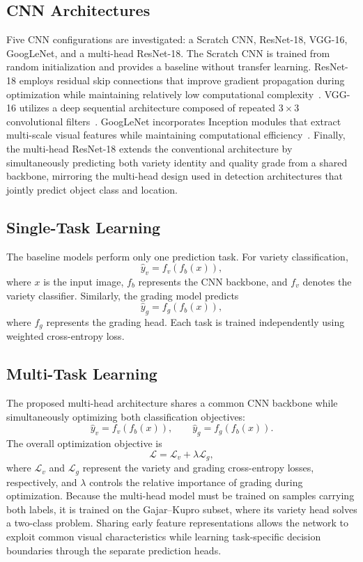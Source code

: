 \documentclass[conference]{IEEEtran}
\begin{document}
\subsection{CNN Architectures}
Five CNN configurations are investigated: a Scratch CNN, ResNet-18, VGG-16, GoogLeNet, and a multi-head ResNet-18. The Scratch CNN is trained from random initialization and provides a baseline without transfer learning. ResNet-18 employs residual skip connections that improve gradient propagation during optimization while maintaining relatively low computational complexity~\cite{he2016resnet}. VGG-16 utilizes a deep sequential architecture composed of repeated $3\times3$ convolutional filters~\cite{simonyan2015vgg}. GoogLeNet incorporates Inception modules that extract multi-scale visual features while maintaining computational efficiency~\cite{szegedy2015googlenet}. Finally, the multi-head ResNet-18 extends the conventional architecture by simultaneously predicting both variety identity and quality grade from a shared backbone, mirroring the multi-head design used in detection architectures that jointly predict object class and location.

\subsection{Single-Task Learning}
The baseline models perform only one prediction task. For variety classification,
\begin{equation}
\hat{y}_v = f_v(f_b(x)),
\end{equation}
where $x$ is the input image, $f_b$ represents the CNN backbone, and $f_v$ denotes the variety classifier. Similarly, the grading model predicts
\begin{equation}
\hat{y}_g = f_g(f_b(x)),
\end{equation}
where $f_g$ represents the grading head. Each task is trained independently using weighted cross-entropy loss.

\subsection{Multi-Task Learning}
The proposed multi-head architecture shares a common CNN backbone while simultaneously optimizing both classification objectives:
\begin{equation}
\hat{y}_v = f_v(f_b(x)), \qquad \hat{y}_g = f_g(f_b(x)).
\end{equation}
The overall optimization objective is
\begin{equation}
\mathcal{L} = \mathcal{L}_v + \lambda \mathcal{L}_g,
\end{equation}
where $\mathcal{L}_v$ and $\mathcal{L}_g$ represent the variety and grading cross-entropy losses, respectively, and $\lambda$ controls the relative importance of grading during optimization. Because the multi-head model must be trained on samples carrying both labels, it is trained on the Gajar--Kupro subset, where its variety head solves a two-class problem. Sharing early feature representations allows the network to exploit common visual characteristics while learning task-specific decision boundaries through the separate prediction heads.
\end{document}
